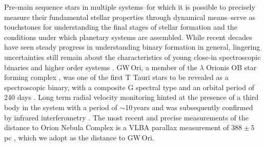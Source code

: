 \documentclass[twocolumn]{aastex61}
\newcommand{\obj}{GW\,Ori}
\begin{document}
Pre-main sequence stars in multiple systems--for which it is possible to precisely measure their fundamental stellar properties through dynamical means--serve as touchstones for understanding the final stages of stellar formation and the conditions under which planetary systems are assembled. While recent decades have seen steady progress in understanding binary formation in general, lingering uncertainties still remain about the characteristics of young close-in spectroscopic binaries and higher order systems \citep{duchene13}.
\obj, a member of the $\lambda$ Orionis OB star forming complex \citep{dolan00,dolan01,dolan02}, was one of the first T Tauri stars to be revealed as a spectroscopic binary, with a composite G spectral type and an orbital period of 240 days \citep{mathieu91}. Long term radial velocity monitoring hinted at the presence of a third body in the system with a period of $\sim$10\,years and was subsequently confirmed by infrared interferometry \citep{berger11}. The most recent and precise measurements of the distance to Orion Nebula Complex is a VLBA parallax measurement of $388\pm5\,$pc \citep{kounkel17}, which we adopt as the distance to \obj.
\end{document}
